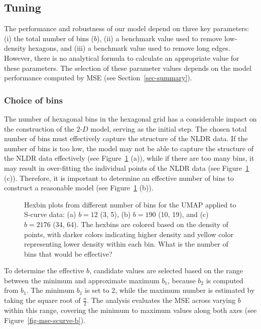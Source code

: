 \documentclass[
  12pt]{article}
\newcommand\gD{$2\text{-}D$}
\begin{document}
\subsection{Tuning}\label{tuning}

The performance and robustness of our model depend on three key
parameters: (i) the total number of bins (\(b\)), (ii) a benchmark value
used to remove low-density hexagons, and (iii) a benchmark value used to
remove long edges. However, there is no analytical formula to calculate
an appropriate value for these parameters. The selection of these
parameter values depends on the model performance computed by MSE (see
Section~\ref{sec-summary}).

\subsubsection{Choice of bins}\label{choice-of-bins}

The number of hexagonal bins in the hexagonal grid has a considerable
impact on the construction of the \gD{} model, serving as the initial
step. The chosen total number of bins must effectively capture the
structure of the NLDR data. If the number of bins is too low, the model
may not be able to capture the structure of the NLDR data effectively
(see Figure~\ref{fig-bins-scurve} (a)), while if there are too many
bins, it may result in over-fitting the individual points of the NLDR
data (see Figure~\ref{fig-bins-scurve} (c)). Therefore, it is important
to determine an effective number of bins to construct a reasonable model
(see Figure~\ref{fig-bins-scurve} (b)).

\begin{figure}[H]


\caption{\label{fig-bins-scurve}Hexbin plots from different number of
bins for the UMAP applied to S-curve data: (a) \(b = 12\) (3, 5), (b)
\(b = 190\) (10, 19), and (c) \(b = 2176\) (34, 64). The hexbins are
colored based on the density of points, with darker colors indicating
higher density and yellow color representing lower density within each
bin. What is the number of bins that would be effective?}

\end{figure}%

To determine the effective \(b\), candidate values are selected based on
the range between the minimum and approximate maximum \(b_1\), because
\(b_2\) is computed from \(b_1\). The minimum \(b_1\) is set to \(2\),
while the maximum number is estimated by taking the square root of
\(\frac{n}{2}\). The analysis evaluates the MSE across varying \(b\)
within this range, covering the minimum to maximum values along both
axes (see Figure~\ref{fig-mse-scurve-b}).
\end{document}
